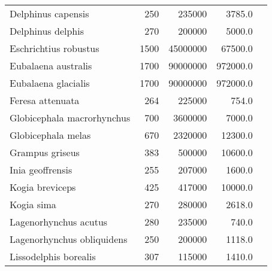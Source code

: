 \begin{longtable}{|p{1in}rrrp{1.5in}|}
          Delphinus capensis  &          250 &      235000  &       3785.0   &                       \citet{jefferson2008,ross1979} \\
           Delphinus delphis  &          270 &      200000  &       5000.0   &                                \citet{jefferson2008} \\
       Eschrichtius robustus  &         1500 &    45000000  &      67500.0   &                                  \citet{tomilin1967} \\
         Eubalaena australis  &         1700 &    90000000  &     972000.0   &                                     \citet{best2001} \\
         Eubalaena glacialis  &         1700 &    90000000  &     972000.0   &                                     \citet{best2001} \\
            Feresa attenuata  &          264 &      225000  &        754.0   &                                \citet{jefferson2008} \\
  Globicephala macrorhynchus  &          700 &     3600000  &       7000.0   &                                \citet{jefferson2008} \\
          Globicephala melas  &          670 &     2320000  &      12300.0   &                  \citet{jefferson2008,desportes1993} \\
             Grampus griseus  &          383 &      500000  &      10600.0   &                     \citet{jefferson2008,perrin1984} \\
            Inia geoffrensis  &          255 &      207000  &       1600.0   &                       \citet{jefferson2008,best1989} \\
             Kogia breviceps  &          425 &      417000  &      10000.0   &   \citet{bloodworth2008,caldwell1971,tomilin1967,ruiz1993} \\
                  Kogia sima  &          270 &      280000  &       2618.0   &                                     \citet{ross1979} \\
       Lagenorhynchus acutus  &          280 &      235000  &        740.0   &                                \citet{jefferson2008} \\
  Lagenorhynchus obliquidens  &          250 &      200000  &       1118.0   &                                 \citet{harrison1972} \\
       Lissodelphis borealis  &          307 &      115000  &       1410.0   &                                 \citet{harrison1972} \\

\end{longtable}
